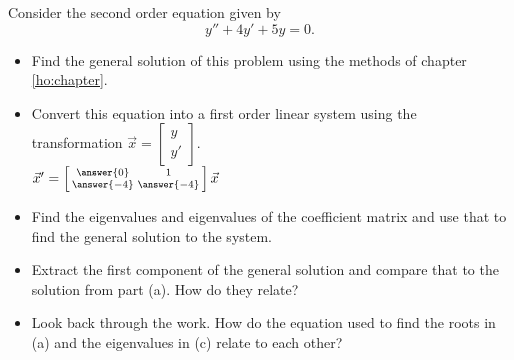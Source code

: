 \documentclass{ximera}
\begin{document}
\begin{exercise}
    Consider the second order equation given by
    \begin{equation*}
        y'' + 4y' + 5y = 0.
    \end{equation*}
    \begin{itemize}
        \item Find the general solution of this problem using the methods of chapter \ref{ho:chapter}.
        \item Convert this equation into a first order linear system using the transformation $\vec{x} = \left[ \begin{smallmatrix} y \\ y' \end{smallmatrix} \right]$. \\
            ${\vec{x}}' = \left[\begin{smallmatrix} \answer{0} & 1 \\ \answer{-4} & \answer{-4} \end{smallmatrix}\right]\vec{x}$
        \item Find the eigenvalues and eigenvalues of the coefficient matrix and use that to find the general solution to the system.
        \item Extract the first component of the general solution and compare that to the solution from part (a). How do they relate?
        \item Look back through the work. How do the equation used to find the roots in (a) and the eigenvalues in (c) relate to each other?
    \end{itemize}
\end{exercise}
\end{document}
